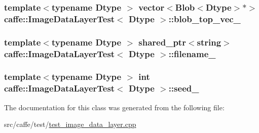 \hypertarget{classcaffe_1_1_image_data_layer_test_a88ea0aa61835ea8c448c21938c39b75a}{
\subsubsection[{blob\+\_\+top\+\_\+vec\+\_\+}]{\setlength{\rightskip}{0pt plus 5cm}template$<$typename Dtype $>$ vector$<${\bf Blob}$<$Dtype$>$$\ast$$>$ {\bf caffe\+::\+Image\+Data\+Layer\+Test}$<$ Dtype $>$\+::blob\+\_\+top\+\_\+vec\+\_\+\hspace{0.3cm}{\ttfamily [protected]}}}\label{classcaffe_1_1_image_data_layer_test_a88ea0aa61835ea8c448c21938c39b75a}
\hypertarget{classcaffe_1_1_image_data_layer_test_a88c92cbd5af9edcd0f0c3b0866b1a637}{
\subsubsection[{filename\+\_\+}]{\setlength{\rightskip}{0pt plus 5cm}template$<$typename Dtype $>$ shared\+\_\+ptr$<$string$>$ {\bf caffe\+::\+Image\+Data\+Layer\+Test}$<$ Dtype $>$\+::filename\+\_\+\hspace{0.3cm}{\ttfamily [protected]}}}\label{classcaffe_1_1_image_data_layer_test_a88c92cbd5af9edcd0f0c3b0866b1a637}
\hypertarget{classcaffe_1_1_image_data_layer_test_a924f088ff064f4b906f55afb402dad96}{
\subsubsection[{seed\+\_\+}]{\setlength{\rightskip}{0pt plus 5cm}template$<$typename Dtype $>$ int {\bf caffe\+::\+Image\+Data\+Layer\+Test}$<$ Dtype $>$\+::seed\+\_\+\hspace{0.3cm}{\ttfamily [protected]}}}\label{classcaffe_1_1_image_data_layer_test_a924f088ff064f4b906f55afb402dad96}


The documentation for this class was generated from the following file\+:\begin{DoxyCompactItemize}
\item 
src/caffe/test/\hyperlink{test__image__data__layer_8cpp}{test\+\_\+image\+\_\+data\+\_\+layer.\+cpp}\end{DoxyCompactItemize}
